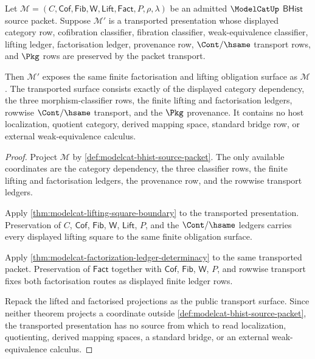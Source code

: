 \begin{theorem}
\label{thm:modelcat-finite-factorization-transport-surface}
Let
$\mathcal{M}=(C,\mathsf{Cof},\mathsf{Fib},\mathsf{W},\mathsf{Lift},\mathsf{Fact},P,\rho,\lambda)$
be an admitted $\ModelCatUp$ $\mathsf{BHist}$ source packet. Suppose
$\mathcal{M}'$ is a transported presentation whose displayed category row,
cofibration classifier, fibration classifier, weak-equivalence classifier,
lifting ledger, factorisation ledger, provenance row, $\Cont/\hsame$ transport
rows, and $\Pkg$ rows are preserved by the packet transport.

Then $\mathcal{M}'$ exposes the same finite factorisation and lifting
obligation surface as $\mathcal{M}$. The transported surface consists exactly
of the displayed category dependency, the three morphism-classifier rows, the
finite lifting and factorisation ledgers, rowwise $\Cont/\hsame$ transport, and
the $\Pkg$ provenance. It contains no host localization, quotient category,
derived mapping space, standard bridge row, or external weak-equivalence
calculus.
\end{theorem}
\begin{proof}
Project $\mathcal{M}$ by
\autoref{def:modelcat-bhist-source-packet}. The only available coordinates are
the category dependency, the three classifier rows, the finite lifting and
factorisation ledgers, the provenance row, and the rowwise transport ledgers.

Apply \autoref{thm:modelcat-lifting-square-boundary} to the transported
presentation. Preservation of $C$, $\mathsf{Cof}$, $\mathsf{Fib}$,
$\mathsf{W}$, $\mathsf{Lift}$, $P$, and the $\Cont/\hsame$ ledgers carries every
displayed lifting square to the same finite obligation surface.

Apply \autoref{thm:modelcat-factorization-ledger-determinacy} to the same
transported packet. Preservation of $\mathsf{Fact}$ together with
$\mathsf{Cof}$, $\mathsf{Fib}$, $\mathsf{W}$, $P$, and rowwise transport fixes
both factorisation routes as displayed finite ledger rows.

Repack the lifted and factorised projections as the public transport surface.
Since neither theorem projects a coordinate outside
\autoref{def:modelcat-bhist-source-packet}, the transported presentation has
no source from which to read localization, quotienting, derived mapping spaces,
a standard bridge, or an external weak-equivalence calculus.
\end{proof}

